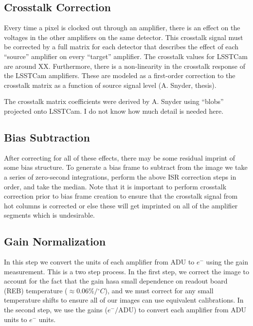\documentclass[SE,authoryear,lsstdraft,toc]{lsstdoc}
\newcommand{\etron}{e^{-}}
\begin{document}
\subsection{Crosstalk Correction}
\label{sec:xtalk}

Every time a pixel is clocked out through an amplifier, there is an effect on
the voltages in the other amplifiers on the same detector.  This crosstalk
signal must be corrected by a full matrix for each detector that describes the
effect of each ``source'' amplifier on every ``target'' amplifier.  The
crosstalk values for LSSTCam are around XX.  Furthermore, there is a
non-linearity in the crosstalk response of the LSSTCam amplifiers.  These are
modeled as a first-order correction to the crosstalk matrix as a function of
source signal level (A. Snyder, thesis).

The crosstalk matrix coefficients were derived by A. Snyder using ``blobs''
projected onto LSSTCam.  I do not know how much detail is needed here.

\subsection{Bias Subtraction}

After correcting for all of these effects, there may be some residual imprint
of some bias structure.  To generate a bias frame to subtract from the image we
take a series of zero-second integrations, perform the above ISR correction
steps in order, and take the median.  Note that it is important to perform
crosstalk correction prior to bias frame creation to ensure that the crosstalk
signal from hot columns is corrected or else these will get imprinted on all of
the amplifier segments which is undesirable.

\subsection{Gain Normalization}

In this step we convert the units of each amplifier from ADU to $\etron$ using
the gain measurement.  This is a two step process.  In the first step, we
correct the image to account for the fact that the gain hasa small dependence
on readout board (REB) temperature ($\approx 0.06\%/{^\circ}C$), and we must
correct for any small temperature shifts to ensure all of our images can use
equivalent calibrations.  In the second step, we use the gains ($\etron /
\mathrm{ADU}$) to convert each amplifier from ADU units to $\etron$ units.
\end{document}
